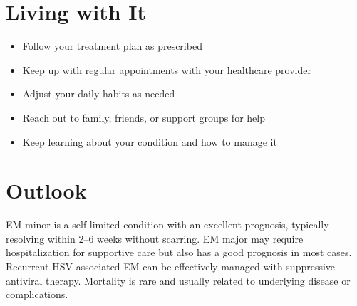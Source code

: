\section{Living with It}

\begin{itemize}[noitemsep]
  \item Follow your treatment plan as prescribed
  \item Keep up with regular appointments with your healthcare provider
  \item Adjust your daily habits as needed
  \item Reach out to family, friends, or support groups for help
  \item Keep learning about your condition and how to manage it
\end{itemize}

\section{Outlook}
EM minor is a self-limited condition with an excellent prognosis, typically resolving within 2--6 weeks without scarring. EM major may require hospitalization for supportive care but also has a good prognosis in most cases. Recurrent HSV-associated EM can be effectively managed with suppressive antiviral therapy. Mortality is rare and usually related to underlying disease or complications.

